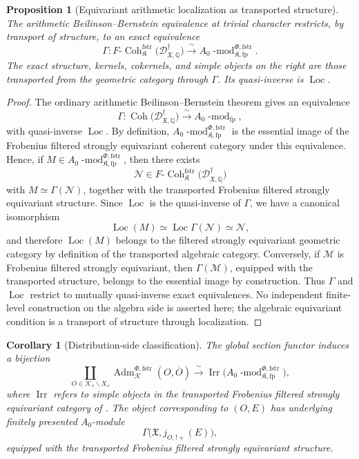 \documentclass[11pt]{amsart}
\theoremstyle{plain}
\newtheorem{proposition}{Proposition}[section]
\newtheorem{corollary}{Corollary}[section]
\theoremstyle{definition}
\theoremstyle{remark}
\newcommand{\Coh}{\operatorname{Coh}}
\newcommand{\Irr}{\operatorname{Irr}}
\newcommand{\fstr}{\mathrm{fstr}}
\newcommand{\Loc}{\operatorname{Loc}}
\newcommand{\Adm}{\operatorname{Adm}}
\begin{document}
\begin{proposition}[Equivariant arithmetic localization as transported structure]
\label{prop:equivariant-ABB-trivial}
The arithmetic Beilinson--Bernstein equivalence at trivial character restricts,
by transport of structure, to an exact equivalence
\[
  \Gamma:
  F\text{-}\Coh^{\fstr}_{\mathfrak K}
  \bigl(\mathscr D^\dagger_{\mathfrak X,\mathbb Q}\bigr)
  \xrightarrow{\;\sim\;}
  A_0\operatorname{-mod}^{\Phi,\fstr}_{\mathfrak K,\mathrm{fp}}.
\]
The exact structure, kernels, cokernels, and simple objects on the right are
those transported from the geometric category through \(\Gamma\).  Its
quasi-inverse is \(\Loc\).
\end{proposition}

\begin{proof}
The ordinary arithmetic Beilinson--Bernstein theorem gives an equivalence
\[
  \Gamma:
  \Coh\bigl(\mathscr D^\dagger_{\mathfrak X,\mathbb Q}\bigr)
  \xrightarrow{\;\sim\;}
  A_0\operatorname{-mod}_{\mathrm{fp}},
\]
with quasi-inverse \(\Loc\). By definition,
\(A_0\operatorname{-mod}^{\Phi,\fstr}_{\mathfrak K,\mathrm{fp}}\)
is the essential image of the Frobenius filtered strongly equivariant coherent category under
this equivalence. Hence, if
\(M\in A_0\operatorname{-mod}^{\Phi,\fstr}_{\mathfrak K,\mathrm{fp}}\), then
there exists
\[
  \mathcal N\in
  F\text{-}\Coh^{\fstr}_{\mathfrak K}
  \bigl(\mathscr D^\dagger_{\mathfrak X,\mathbb Q}\bigr)
\]
with \(M\simeq \Gamma(\mathcal N)\), together with the transported
Frobenius filtered strongly equivariant structure. Since \(\Loc\) is the
quasi-inverse of \(\Gamma\), we have a canonical isomorphism
\[
  \Loc(M)\simeq \Loc\Gamma(\mathcal N)\simeq \mathcal N,
\]
and therefore \(\Loc(M)\) belongs to the filtered strongly equivariant
geometric category by definition of the transported algebraic category.
Conversely, if \(\mathcal M\) is Frobenius filtered strongly equivariant, then
\(\Gamma(\mathcal M)\), equipped with the transported structure, belongs to the
essential image by construction. Thus \(\Gamma\) and \(\Loc\) restrict to
mutually quasi-inverse exact equivalences.  No independent finite-level
construction on the algebra side is asserted here; the algebraic equivariant
condition is a transport of structure through localization.
\end{proof}

\begin{corollary}[Distribution-side classification]
\label{thm:distribution-classification}
The global section functor induces a bijection
\[
  \coprod_{O\in \mathcal K_s\backslash X_s}
  \Adm^{\Phi,\fstr}_{\mathcal K}(O,\overline O)
  \xrightarrow{\;\sim\;}
  \Irr
  \bigl(A_0\operatorname{-mod}^{\Phi,\fstr}_{\mathfrak K,\mathrm{fp}}\bigr),
\]
where \(\Irr\) refers to simple objects in the transported Frobenius filtered
strongly equivariant category of .  The
object corresponding to \((O,E)\) has underlying finitely presented
\(A_0\)-module
\[
  \Gamma\bigl(\mathfrak X,j_{O,!+}(E)\bigr),
\]
equipped with the transported Frobenius filtered strongly equivariant
structure.
\end{corollary}
\end{document}
